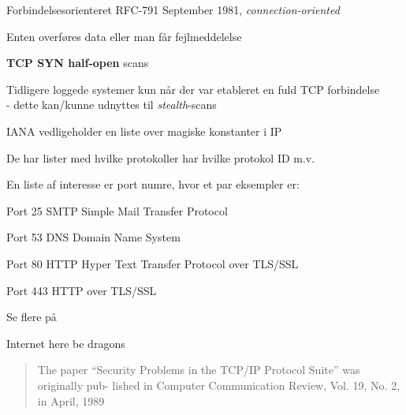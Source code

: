\documentclass[Screen16to9,17pt]{foils}
\begin{document}

\begin{list1}
\item Forbindelsesorienteret RFC-791 September 1981, \emph{connection-oriented}
\item Enten overføres data eller man får fejlmeddelelse
\end{list1}



\begin{list2}
\item {\bfseries TCP SYN half-open} scans
\item Tidligere loggede systemer kun når der var etableret en fuld TCP
  forbindelse\\
- dette kan/kunne udnyttes til \emph{stealth}-scans
\end{list2}




\begin{list1}
\item IANA vedligeholder en liste over magiske konstanter i IP
\item De har lister med hvilke protokoller har hvilke protokol ID m.v.
\item En liste af interesse er port numre, hvor et par eksempler er:
\begin{list2}
\item Port 25 SMTP Simple Mail Transfer Protocol
\item Port 53 DNS Domain Name System
\item Port 80 HTTP Hyper Text Transfer Protocol over TLS/SSL
\item Port 443 HTTP over TLS/SSL
\end{list2}
\item Se flere på 
\end{list1}




\vskip 2cm
\centerline{\LARGE Internet here be dragons}


\begin{quote}
The paper “Security Problems in the TCP/IP Protocol Suite” was originally pub-
lished in Computer Communication Review, Vol. 19, No. 2, in April, 1989
\end{quote}
\end{document}
